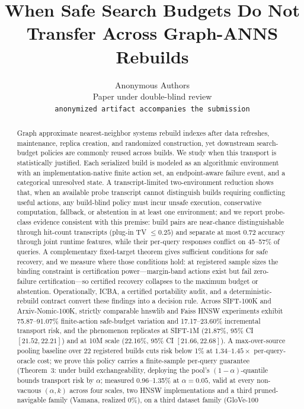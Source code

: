 \documentclass{article}
\title{When Safe Search Budgets Do Not Transfer Across Graph-ANNS Rebuilds}
\author{Anonymous Authors\\
Paper under double-blind review\\
\texttt{anonymized artifact accompanies the submission}}
\begin{document}
\maketitle

\begin{abstract}
Graph approximate nearest-neighbor systems rebuild indexes after data refreshes, maintenance, replica
creation, and randomized construction, yet downstream search-budget policies are commonly reused across
builds. We study when this transport is statistically justified. Each serialized build is modeled as an
algorithmic environment with an implementation-native finite action set, an endpoint-aware failure event,
and a categorical unresolved state. A transcript-limited two-environment reduction shows that, when an
available probe transcript cannot distinguish builds requiring conflicting useful actions, any build-blind
policy must incur unsafe execution, conservative computation, fallback, or abstention in at least one
environment; and we report probe-class evidence consistent with this premise: build pairs are
near-chance distinguishable through hit-count transcripts (plug-in TV $\le0.25$) and separate at most
$0.72$ accuracy through joint runtime features, while their per-query responses conflict on 45--57\% of
queries. A complementary fixed-target theorem gives sufficient conditions for safe recovery, and
we measure where those conditions hold: at registered sample sizes the binding constraint is
certification power---margin-band actions exist but fail zero-failure certification---so certified recovery
collapses to the maximum budget or abstention. Operationally, ICBA, a
certified portability audit, and a deterministic-rebuild contract convert these findings into a decision
rule. Across SIFT-100K and Arxiv-Nomic-100K, strictly comparable hnswlib and Faiss HNSW experiments exhibit
75.87--91.07\% finite-action safe-budget variation and 17.17--23.60\% incremental transport risk, and the
phenomenon replicates at SIFT-1M (21.87\%, 95\% CI $[21.52, 22.21]$) and at 10M scale
(22.16\%, 95\% CI $[21.66, 22.68]$). A max-over-source pooling baseline over
22 registered builds cuts risk below 1\% at $1.34$--$1.45\times$ per-query-oracle cost; we prove this
policy carries a finite-sample per-query guarantee (Theorem~3: under build exchangeability, deploying the
pool's $(1{-}\alpha)$-quantile bounds transport risk by $\alpha$; measured 0.96--1.35\% at
$\alpha{=}0.05$, valid at every non-vacuous $(\alpha,k)$ across four scales, two HNSW implementations
and a third pruned-navigable family (Vamana, realized 0\%), on a third dataset family (GloVe-100

\end{abstract}
\end{document}
